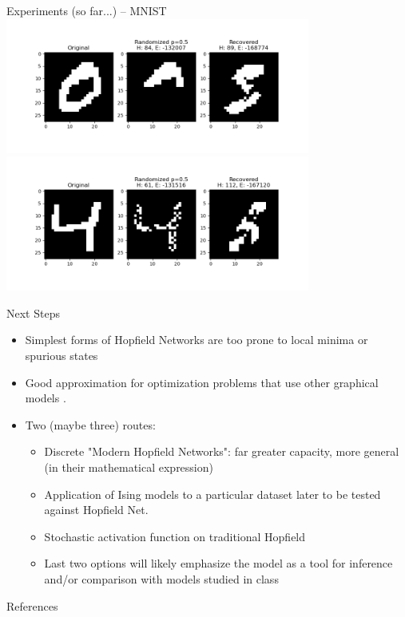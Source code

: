 \documentclass[10pt]{beamer}
\begin{document}
\begin{frame}{Experiments (so far...) -- MNIST}	
	\centering
	\includegraphics[width=0.75\textwidth]{"../img/digits_result_bad_covered.png"}\\
	\includegraphics[width=0.75\textwidth]{"../img/digits_result_bad_random.png"}
\end{frame}


\begin{frame}{Next Steps}
	\begin{itemize}
		\item Simplest forms of Hopfield Networks are too prone to local minima or spurious states
		\item Good approximation for optimization problems that use other graphical models \cite{mackay2003information}.
		\item Two (maybe three) routes:
			\begin{itemize}
				\item Discrete "Modern Hopfield Networks": far greater capacity, more general (in their mathematical expression) \cite{krotov2016dense}
				\item Application of Ising models to a particular dataset later to be tested against Hopfield Net.
				\item Stochastic activation function on traditional Hopfield
				\item Last two options will likely emphasize the model as a tool for inference and/or comparison with models studied in class
			\end{itemize}
	\end{itemize}
\end{frame}

\begin{frame}{References}
	\printbibliography
\end{frame}
\end{document}
